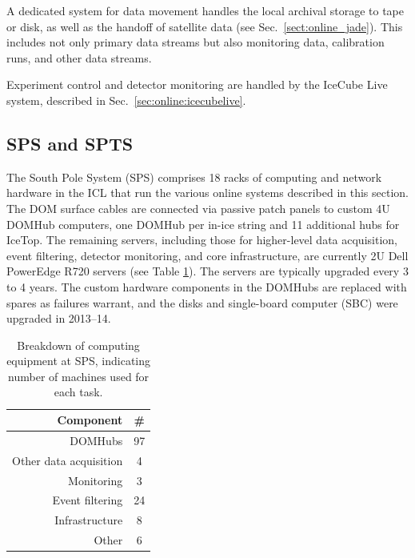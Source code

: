 A dedicated system for data movement handles the local archival storage to
tape or disk, as well as the handoff of satellite data (see Sec.~\ref{sect:online_jade}).
This includes not only primary data streams but also monitoring data,
calibration runs, and other data streams.

Experiment control and detector monitoring are handled by the IceCube
Live system, described in Sec.~\ref{sec:online:icecubelive}.



\subsection{\label{sect:sps}SPS and SPTS}

The South Pole System (SPS) comprises 18 racks of computing and
network hardware in the ICL that run the various online systems described in this
section.  The DOM surface cables are connected via passive patch panels to
custom 4U DOMHub computers, one DOMHub per in-ice string and 11 additional
hubs for IceTop.  The remaining servers, including those for higher-level
data acquisition, event filtering, detector monitoring, and core
infrastructure, are currently 2U Dell PowerEdge R720 servers (see Table
\ref{tab:sps_breakdown}).  The servers are typically upgraded every 3 to 4
years.  The custom hardware components in the DOMHubs are replaced with spares as
failures warrant, and the disks and single-board computer (SBC) were
upgraded in 2013--14.

\begin{table}[h]
  \centering
  \begin{tabular}{ r | c }
    \bf{Component} & \bf{\#} \\
    \hline
    DOMHubs & 97 \\
    Other data acquisition & 4 \\
    Monitoring & 3 \\
    Event filtering & 24 \\
    Infrastructure & 8 \\
    Other & 6 \\ 
  \end{tabular}
  \caption{Breakdown of computing equipment at SPS, indicating number of
    machines used for each task.} 
  \label{tab:sps_breakdown}
\end{table}

